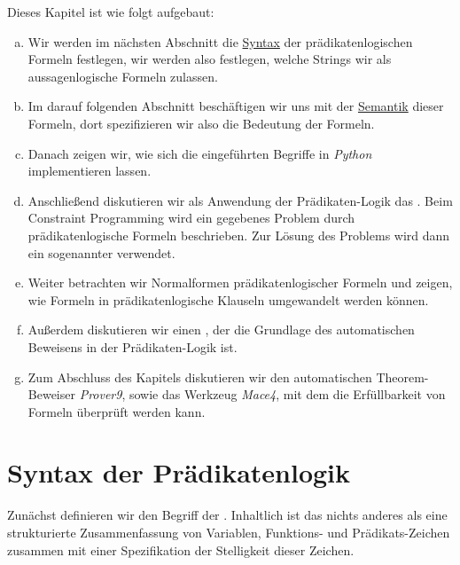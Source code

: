 Dieses Kapitel ist wie folgt aufgebaut:
\begin{enumerate}[(a)]
\item Wir werden im nächsten Abschnitt die \href{https://de.wikipedia.org/wiki/Syntax}{Syntax} der
      prädikatenlogischen Formeln festlegen, wir werden also festlegen, welche Strings wir als aussagenlogische
      Formeln zulassen.
\item Im darauf folgenden Abschnitt beschäftigen wir uns mit der
      \href{https://de.wikipedia.org/wiki/Semantik}{Semantik} dieser Formeln, dort spe\-zifizieren wir also die 
      Bedeutung der Formeln. 
\item Danach zeigen wir, wie sich die eingeführten Begriffe in \textsl{Python} implementieren lassen.
\item Anschließend diskutieren wir als Anwendung der Prädikaten-Logik das .
      Beim Constraint Programming wird ein gegebenes Problem durch prädikatenlogische Formeln beschrieben.
      Zur Lösung des Problems wird dann ein sogenannter  verwendet.
\item Weiter betrachten wir Normalformen prädikatenlogischer Formeln und zeigen, wie Formeln
      in  prädikatenlogische Klauseln umgewandelt werden können.
\item Außerdem diskutieren wir einen , der die Grundlage
      des automatischen Beweisens in der Prädikaten-Logik ist.
\item Zum Abschluss des Kapitels diskutieren wir den automatischen Theorem-Beweiser \textsl{Prover9}, sowie das
      Werkzeug \textsl{Mace4}, mit dem die Erfüllbarkeit von Formeln überprüft werden kann.
\end{enumerate}

\section{Syntax der Prädikatenlogik}
Zunächst definieren wir den Begriff der . Inhaltlich ist das nichts anderes als
eine strukturierte Zusammenfassung von Variablen, Funktions- und Prädikats-Zeichen zusammen mit
einer Spezifikation der Stelligkeit dieser Zeichen.
 
